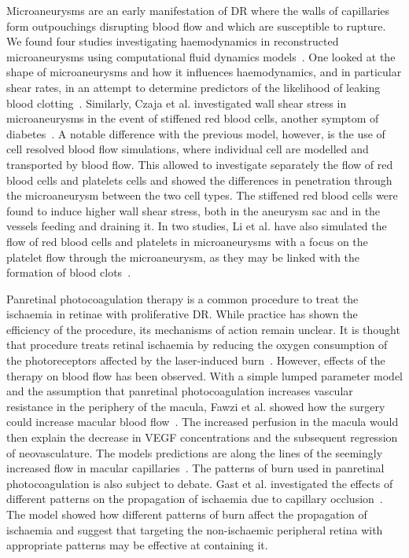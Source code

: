 \documentclass{article}
\begin{document}
Microaneurysms are an early manifestation of DR where the walls of capillaries form outpouchings disrupting blood flow and which are susceptible to rupture.
We found four studies investigating haemodynamics in reconstructed microaneurysms using computational fluid dynamics models~\cite{Bernabeu_2018,Czaja_2022,Li_2020,Li_2022}.
One looked at the shape of microaneurysms and how it influences haemodynamics, and in particular shear rates, in an attempt to determine predictors of the likelihood of leaking blood clotting~\cite{Bernabeu_2018}.
Similarly, Czaja et al. investigated wall shear stress in microaneurysms in the event of stiffened red blood cells, another symptom of diabetes~\cite{Czaja_2022}.
A notable difference with the previous model, however, is the use of cell resolved blood flow simulations, where individual cell are modelled and transported by blood flow.
This allowed to investigate separately the flow of red blood cells and platelets cells and showed the differences in penetration through the microaneurysm between the two cell types.
The stiffened red blood cells were found to induce higher wall shear stress, both in the aneurysm sac and in the vessels feeding and draining it.
In two studies, Li et al. have also simulated the flow of red blood cells and platelets in microaneurysms with a focus on the platelet flow through the microaneurysm, as they may be linked with the formation of blood clots~\cite{Li_2020,Li_2022}.


Panretinal photocoagulation therapy is a common procedure to treat the ischaemia in retinae with proliferative DR.
While practice has shown the efficiency of the procedure, its mechanisms of action remain unclear.
It is thought that procedure treats retinal ischaemia by reducing the oxygen consumption of the photoreceptors affected by the laser-induced burn~\cite{Fawzi_2019,Gast_2016}.
However, effects of the therapy on blood flow has been observed.
With a simple lumped parameter model and the assumption that panretinal photocoagulation increases vascular resistance in the periphery of the macula, Fawzi et al. showed how the surgery could increase macular blood flow~\cite{Fawzi_2019}.
The increased perfusion in the macula would then explain the decrease in VEGF concentrations and the subsequent regression of neovasculature.
The models predictions are along the lines of the seemingly increased flow in macular capillaries~\cite{Fawzi_2019}.
The patterns of burn used in panretinal photocoagulation is also subject to debate.
Gast et al. investigated the effects of different patterns on the propagation of ischaemia due to capillary occlusion~\cite{Gast_2016}.
The model showed how different patterns of burn affect the propagation of ischaemia and suggest that targeting the non-ischaemic peripheral retina with appropriate patterns may be effective at containing it.
\end{document}
